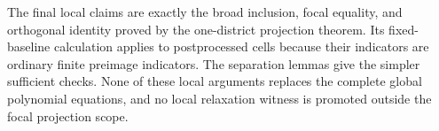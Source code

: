 The final local claims are exactly the broad inclusion, focal equality, and orthogonal identity proved by the one-district projection theorem.  Its fixed-baseline calculation applies to postprocessed cells because their indicators are ordinary finite preimage indicators.  The separation lemmas give the simpler sufficient checks.  None of these local arguments replaces the complete global polynomial equations, and no local relaxation witness is promoted outside the focal projection scope.